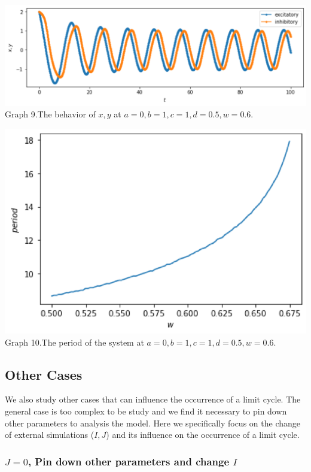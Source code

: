 \documentclass[12pt]{article}
\begin{document}
\begin{center}
  \includegraphics[scale=0.5]{ Py-simu-03.png}\\
    \footnotesize{Graph 9.The behavior of $x,y$ at $a=0,b=1,c=1,d=0.5,w=0.6$.}
  \end{center}

  \begin{center}
    \includegraphics[scale=0.5]{ Py-simu-02.png}\\
      \footnotesize{Graph 10.The period of the system at $a=0,b=1,c=1,d=0.5,w=0.6$.}
    \end{center}


\subsection{Other Cases}

We also study other cases that can influence the occurrence of a limit cycle. The general case is too complex to be study and we find it necessary to pin down other parameters to analysis the model. Here we specifically focus on the change of external simulations ($I,J$) and its influence on the occurrence of a limit cycle.

\subsubsection{$J=0$, Pin down other parameters and change $I$}
\end{document}
